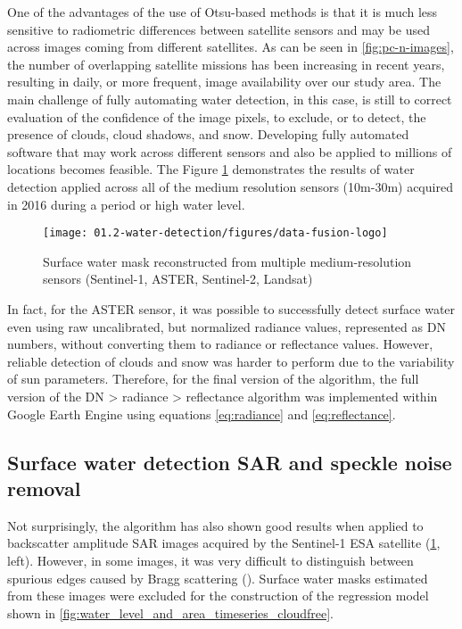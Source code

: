 One of the advantages of the use of Otsu-based methods is that it is much less sensitive to radiometric differences between satellite sensors and may be used across images coming from different satellites. As can be seen in \ref{fig:pc-n-images}, the number of overlapping satellite missions has been increasing in recent years, resulting in daily, or more frequent, image availability over our study area. The main challenge of fully automating water detection, in this case, is still to correct evaluation of the confidence of the image pixels, to exclude, or to detect, the presence of clouds, cloud shadows, and snow. Developing fully automated software that may work across different sensors and also be applied to millions of locations becomes feasible. The Figure \ref{fig:multiple-sensors} demonstrates the results of water detection applied across all of the medium resolution sensors (10m-30m) acquired in 2016 during a period or high water level.

\begin{figure}[H]
	\texttt{[image: 01.2-water-detection/figures/data-fusion-logo]}
	\caption{Surface water mask reconstructed from multiple medium-resolution sensors (Sentinel-1, ASTER, Sentinel-2, Landsat)}
	\label{fig:multiple-sensors}
\end{figure}

In fact, for the ASTER sensor, it was possible to successfully detect surface water even using raw uncalibrated, but normalized radiance values, represented as DN numbers, without converting them to radiance or reflectance values. However, reliable detection of clouds and snow was harder to perform due to the variability of sun parameters. Therefore, for the final version of the algorithm, the full version of the DN > radiance > reflectance algorithm was implemented within Google Earth Engine using equations \ref{eq:radiance} and \ref{eq:reflectance}.

\subsection{Surface water detection SAR and speckle noise removal}

Not surprisingly, the algorithm has also shown good results when applied to backscatter amplitude \gls{SAR} images acquired by the Sentinel-1 ESA satellite (\ref{fig:multiple-sensors}, left). However, in some images, it was very difficult to distinguish between spurious edges caused by Bragg scattering (\citet{liebe2009suitability}). Surface water masks estimated from these images were excluded for the construction of the regression model shown in \ref{fig:water_level_and_area_timeseries_cloudfree}.

